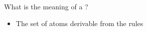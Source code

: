 \begin{frame}{What is the meaning of a ?}
  \begin{itemize}
  \item<4->  The set of atoms derivable from the rules
  \end{itemize}
\end{frame}
%
